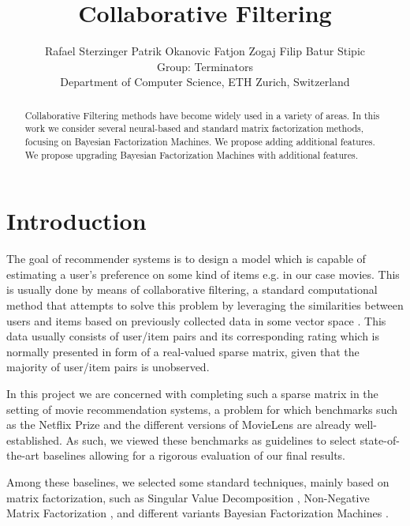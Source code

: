 \documentclass[10pt,conference,compsocconf]{IEEEtran}
\newcommand{\spacing}{\hspace{1cm}}
\begin{document}
    \title{Collaborative Filtering}

    \author{
    Rafael Sterzinger \spacing Patrik Okanovic \spacing Fatjon Zogaj \spacing Filip Batur Stipic\\
    Group: Terminators\\
    Department of Computer Science, ETH Zurich, Switzerland
    }

    \maketitle

    \begin{abstract}
    Collaborative Filtering methods have become widely used in a variety of areas. In this work we consider several neural-based and standard matrix factorization methods, focusing on Bayesian Factorization Machines. We propose adding additional features. We propose upgrading Bayesian Factorization Machines with additional features.

    \end{abstract}


    \section{Introduction}

    The goal of recommender systems is to design a model which is capable of estimating a user's preference on some kind of items e.g. in our case movies.
    This is usually done by means of collaborative filtering, a standard computational method that attempts to solve this problem by leveraging the similarities between users and items based on previously collected data in some vector space \cite{CF_survey}.
    This data usually consists of user/item pairs and its corresponding rating which is normally presented in form of a real-valued sparse matrix, given that the majority of user/item pairs is unobserved.

    In this project we are concerned with completing such a sparse matrix in the setting of movie recommendation systems, a problem for which benchmarks such as the Netflix Prize \cite{Netflix} and the different versions of MovieLens \cite{Movielens} are already well-established.
    As such, we viewed these benchmarks as guidelines to select state-of-the-art baselines allowing for a rigorous evaluation of our final results.

    Among these baselines, we selected some standard techniques, mainly based on matrix factorization, such as Singular Value Decomposition \cite{svd}, Non-Negative Matrix Factorization \cite{6165290}, and different variants Bayesian Factorization Machines \cite{freudenthaler_bayesian_2011, salakhutdinov_bayesian_2008}.
\end{document}
